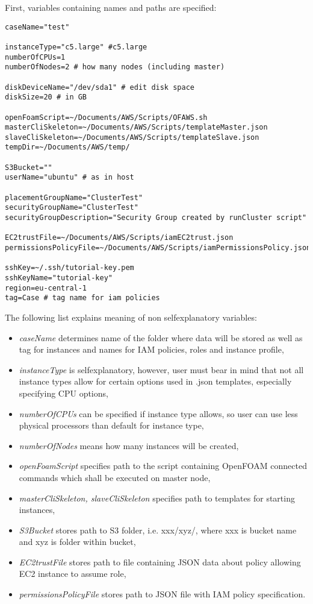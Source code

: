 \documentclass[12pt,english]{article}
\begin{document}
First, variables containing names and paths are specified:
\begin{lstlisting}
caseName="test"

instanceType="c5.large" #c5.large
numberOfCPUs=1
numberOfNodes=2 # how many nodes (including master)

diskDeviceName="/dev/sda1" # edit disk space
diskSize=20 # in GB

openFoamScript=~/Documents/AWS/Scripts/OFAWS.sh
masterCliSkeleton=~/Documents/AWS/Scripts/templateMaster.json
slaveCliSkeleton=~/Documents/AWS/Scripts/templateSlave.json
tempDir=~/Documents/AWS/temp/

S3Bucket=""
userName="ubuntu" # as in host

placementGroupName="ClusterTest"
securityGroupName="ClusterTest"
securityGroupDescription="Security Group created by runCluster script"

EC2trustFile=~/Documents/AWS/Scripts/iamEC2trust.json
permissionsPolicyFile=~/Documents/AWS/Scripts/iamPermissionsPolicy.json

sshKey=~/.ssh/tutorial-key.pem
sshKeyName="tutorial-key"
region=eu-central-1
tag=Case # tag name for iam policies
\end{lstlisting}
The following list explains meaning of non selfexplanatory variables:
\begin{itemize}
	\item \textit{caseName} determines name of the folder where data will be stored as well as tag for instances and names for IAM policies, roles and instance profile,
	\item \textit{instanceType} is selfexplanatory, however, user must bear in mind that not all instance types allow for certain options used in .json templates, especially specifying CPU options,
	\item \textit{numberOfCPUs} can be specified if instance type allows, so user can use less physical processors than default for instance type,
	\item \textit{numberOfNodes} means how many instances will be created,
	\item \textit{openFoamScript} specifies path to the script containing OpenFOAM connected commands which shall be executed on master node,
	\item \textit{masterCliSkeleton, slaveCliSkeleton} specifies path to templates for starting instances,
	\item \textit{S3Bucket} stores path to S3 folder, i.e. xxx/xyz/, where xxx is bucket name and xyz is folder within bucket,
	\item \textit{EC2trustFile} stores path to file containing JSON data about policy allowing EC2 instance to assume role,
	\item \textit{permissionsPolicyFile} stores path to JSON file with IAM policy specification.
\end{itemize}
\end{document}
